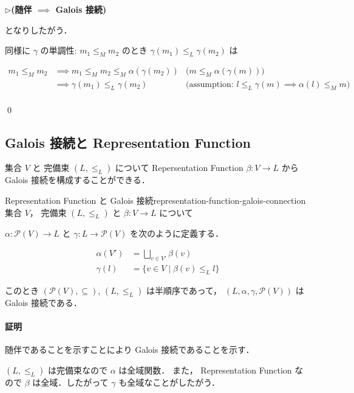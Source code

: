 \documentclass[uplatex]{jsarticle}
\newenvironment{proofpart}[1]
  {\par\vspace{1em}\noindent\hspace{10pt}$\triangleright$\hspace{5pt}\textbf{#1}\\[0.3em]
   \hspace{10pt}\begin{tcolorbox}[enhanced,
     left=20pt, right=0pt, top=3pt, bottom=3pt,
     colback=white,
     colframe=white,
     leftrule=0.3pt,
     rightrule=0pt,
     toprule=0pt,
     bottomrule=0pt,
     sharp corners,
     boxsep=0pt,
     before skip=0pt,
     after skip=1em
   ]}
  {\end{tcolorbox}}
\begin{document}
\begin{proofpart}{(随伴 $\implies$ Galois 接続)}
  となりしたがう．

  同様に $\gamma$ の単調性: $m_1 \leq_M m_2$ のとき $\gamma(m_1) \leq_L \gamma(m_2)$ は

  \begin{align*}
    m_1 \leq_M m_2
     & \implies m_1 \leq_M m_2 \leq_M \alpha(\gamma(m_2))
     & \text{($m \leq_M \alpha(\gamma(m))$)}                                 \\
     & \implies \gamma(m_1) \leq_L \gamma(m_2)
     & \text{(assumption: $l \leq_L \gamma(m) \implies \alpha(l) \leq_M m$)} \\
  \end{align*}

\end{proofpart}

\qed

\subsection{Galois 接続と Representation Function}

集合 $V$ と 完備束 $(L, \leq_L)$ について
Repersentation Function $\beta: V \to L$ から Galois 接続を構成することができる．

\begin{boxtheorem}{Representation Function と Galois 接続}{representation-function-galois-connection}
  集合 $V$， 完備束 $(L, \leq_L)$ と $\beta: V \to L$ について

  $\alpha: \mathcal{P}(V) \to L$ と $\gamma: L \to \mathcal{P}(V)$ を次のように定義する．

  \begin{align*}
    \alpha(V') & = \bigsqcup_{v \in V'} \beta(v)        \\
    \gamma(l)  & = \{ v \in V \mid \beta(v) \leq_L l \}
  \end{align*}

  このとき $(\mathcal{P}(V), \subseteq)$, $(L, \leq_L)$ は半順序であって，
  $(L, \alpha, \gamma, \mathcal{P}(V))$ は Galois 接続である．
\end{boxtheorem}

\paragraph*{証明}

随伴であることを示すことにより Galois 接続であることを示す．

$(L, \leq_L)$ は完備束なので $\alpha$ は全域関数．
また， Representation Function なので $\beta$ は全域．したがって $\gamma$ も全域なことがしたがう．
\end{document}
